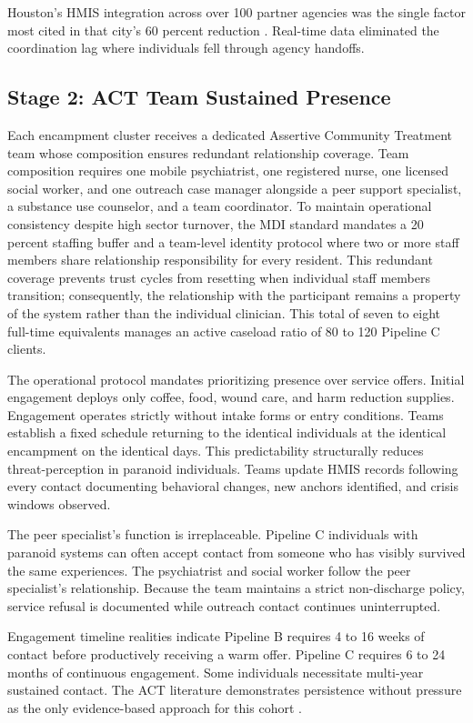 \documentclass[12pt, letterpaper]{article}
\begin{document}
Houston's HMIS integration across over 100 partner agencies was the single factor most cited in that city's 60 percent reduction \citep{houston_way_home_2024}. Real-time data eliminated the coordination lag where individuals fell through agency handoffs.

\subsection{Stage 2: ACT Team Sustained Presence}

Each encampment cluster receives a dedicated Assertive Community Treatment team whose composition ensures redundant relationship coverage. Team composition requires one mobile psychiatrist, one registered nurse, one licensed social worker, and one outreach case manager alongside a peer support specialist, a substance use counselor, and a team coordinator. To maintain operational consistency despite high sector turnover, the MDI standard mandates a 20 percent staffing buffer and a team-level identity protocol where two or more staff members share relationship responsibility for every resident. This redundant coverage prevents trust cycles from resetting when individual staff members transition; consequently, the relationship with the participant remains a property of the system rather than the individual clinician. This total of seven to eight full-time equivalents manages an active caseload ratio of 80 to 120 Pipeline C clients.

The operational protocol mandates prioritizing presence over service offers. Initial engagement deploys only coffee, food, wound care, and harm reduction supplies. Engagement operates strictly without intake forms or entry conditions. Teams establish a fixed schedule returning to the identical individuals at the identical encampment on the identical days. This predictability structurally reduces threat-perception in paranoid individuals. Teams update HMIS records following every contact documenting behavioral changes, new anchors identified, and crisis windows observed.

The peer specialist's function is irreplaceable. Pipeline C individuals with paranoid systems can often accept contact from someone who has visibly survived the same experiences. The psychiatrist and social worker follow the peer specialist's relationship. Because the team maintains a strict non-discharge policy, service refusal is documented while outreach contact continues uninterrupted.

Engagement timeline realities indicate Pipeline B requires 4 to 16 weeks of contact before productively receiving a warm offer. Pipeline C requires 6 to 24 months of continuous engagement. Some individuals necessitate multi-year sustained contact. The ACT literature demonstrates persistence without pressure as the only evidence-based approach for this cohort \citep{samhsa_act_2024}.
\end{document}
